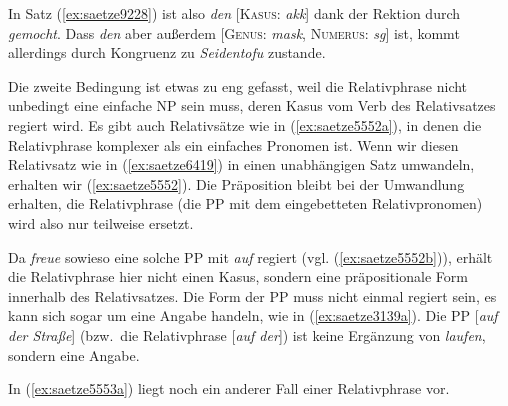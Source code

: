 \noindent In Satz (\ref{ex:saetze9228}) ist also \textit{den} [\textsc{Kasus}: \textit{akk}] dank der Rektion durch \textit{gemocht}.
Dass \textit{den} aber außerdem [\textsc{Genus}: \textit{mask}, \textsc{Numerus}: \textit{sg}] ist, kommt allerdings durch Kongruenz zu \textit{Seidentofu} zustande.

Die zweite Bedingung ist etwas zu eng gefasst, weil die Relativphrase nicht unbedingt eine einfache NP sein muss, deren Kasus vom Verb des Relativsatzes regiert wird.
Es gibt auch Relativsätze wie in (\ref{ex:saetze5552a}), in denen die Relativphrase komplexer als ein einfaches Pronomen ist.
Wenn wir diesen Relativsatz wie in (\ref{ex:saetze6419}) in einen unabhängigen Satz umwandeln, erhalten wir (\ref{ex:saetze5552}).
Die Präposition bleibt bei der Umwandlung erhalten, die Relativphrase (die PP mit dem eingebetteten Relativpronomen) wird also nur teilweise ersetzt.

\begin{exe}
  \ex\label{ex:saetze5552} 
    \begin{xlist}
    \end{xlist} 
\end{exe}

Da \textit{freue} sowieso eine solche PP mit \textit{auf} regiert (vgl. (\ref{ex:saetze5552b})), erhält die Relativphrase hier nicht einen Kasus, sondern eine präpositionale Form innerhalb des Relativsatzes.
Die Form der PP muss nicht einmal regiert sein, es kann sich sogar um eine Angabe handeln, wie in (\ref{ex:saetze3139a}).
Die PP [\textit{auf der Straße}] (bzw.\ die Relativphrase [\textit{auf der}]) ist keine Ergänzung von \textit{laufen}, sondern eine Angabe.

\begin{exe}
  \ex\label{ex:saetze3139}
  \begin{xlist}
  \end{xlist}
\end{exe}

In (\ref{ex:saetze5553a}) liegt noch ein anderer Fall einer Relativphrase vor.

\begin{exe}
  \ex\label{ex:saetze5553} 
    \begin{xlist}
    \end{xlist}
\end{exe}

